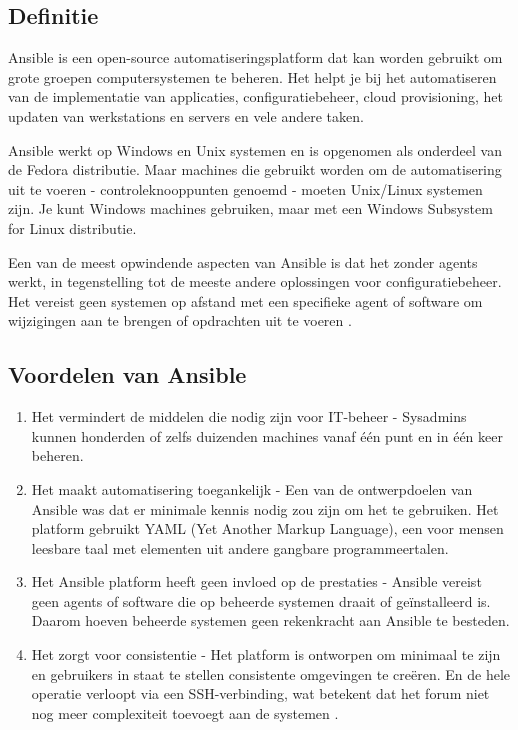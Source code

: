 \subsection{Definitie}
\label{Definitie}
Ansible is een open-source automatiseringsplatform dat kan worden gebruikt om grote groepen computersystemen te beheren. 
Het helpt je bij het automatiseren van de implementatie van applicaties, configuratiebeheer, cloud provisioning, 
het updaten van werkstations en servers en vele andere taken. 
\par 
Ansible werkt op Windows en Unix systemen en is opgenomen 
als onderdeel van de Fedora distributie. Maar machines die gebruikt worden om de automatisering uit te voeren - 
controleknooppunten genoemd - moeten Unix/Linux systemen zijn. Je kunt Windows machines gebruiken, 
maar met een Windows Subsystem for Linux distributie. 
\par
Een van de meest opwindende aspecten van Ansible is dat het zonder 
agents werkt, in tegenstelling tot de meeste andere oplossingen voor configuratiebeheer. 
Het vereist geen systemen op afstand met een specifieke agent of software om wijzigingen 
aan te brengen of opdrachten uit te voeren
\autocite{Manjaly2022}.

\subsection{Voordelen van Ansible}
\label{Voordelen van Ansible}

\begin{enumerate}
  \item Het vermindert de middelen die nodig zijn voor IT-beheer - Sysadmins kunnen honderden of zelfs duizenden machines 
  vanaf één punt en in één keer beheren.

  \item Het maakt automatisering toegankelijk - Een van de ontwerpdoelen van Ansible was dat er minimale kennis nodig zou zijn 
  om het te gebruiken. Het platform gebruikt YAML (Yet Another Markup Language), een voor mensen leesbare taal met elementen 
  uit andere gangbare programmeertalen.

  \item Het Ansible platform heeft geen invloed op de prestaties - Ansible vereist geen agents of software die op beheerde 
  systemen draait of geïnstalleerd is. Daarom hoeven beheerde systemen geen rekenkracht aan Ansible te besteden.

  \item Het zorgt voor consistentie - Het platform is ontworpen om minimaal te zijn en gebruikers in staat te stellen consistente 
  omgevingen te creëren. En de hele operatie verloopt via een SSH-verbinding, wat betekent dat het forum niet nog meer 
  complexiteit toevoegt aan de systemen
  \autocite{Manjaly2022}.
\end{enumerate}

